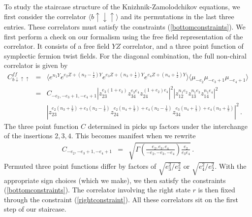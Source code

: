 \documentclass[12pt]{article}
\numberwithin{equation}{section}
\numberwithin{equation}{section}
\numberwithin{table}{section}\setlength{\multlinegap}{25pt}
\begin{document}
To study the staircase structure of the Knizhnik-Zamolodchikov equations, 
we first consider the correlator $\langle b \uparrow \downarrow \uparrow \rangle$
and its permutations in the last three entries. These correlators must satisfy the constraints
(\ref{bottomconstraints}). We first perform a check on our formalism using the free
field representation of the correlator. It consists of a free field $YZ$ correlator,
and a three point function of symplectic fermion twist fields. For the diagonal combination,
the full non-chiral correlator is given by
\begin{eqnarray}
C_{b  \downarrow \uparrow \uparrow}^{ff} &=& \langle e^{n_1 Y} e^{e_2 Z + (n_2-\frac{1}{2}) Y} e^{e_3 Z + (n_3+\frac{1}{2}) Y} e^{e_4 Z + (n_4+\frac{1}{2}) Y} \rangle
\langle \mu_{-e_2} \mu_{-e_3+1} \mu_{-e_4+1} \rangle
\nonumber \\
&=& C_{-e_2,-e_3+1,-e_4+1} |z_{23}^{e_3 (1+e_2)} z_{34}^{e_3 e_4} z_{24}^{(1+e_2) e_4}|^2 
|z_{12}^{n_1 e_2} z_{13}^{n_1 e_3} z_{14}^{n_1 e_4}|^2  \\
& &| z_{23}^{e_2 (n_3+\frac{1}{2})+e_3 (n_2-\frac{1}{2})} z_{24}^{e_2(n_4+\frac{1}{2})+e_4(n_2-\frac{1}{2})} z_{34}^{e_3 (n_4+\frac{1}{2})+e_4 (n_3+\frac{1}{2})}|^2 \, .
\nonumber
\end{eqnarray}
The three point function $C$ determined in \cite{Kausch:2000fu} picks up factors under the interchange of the insertions $2,3,4$.
This becomes manifest when we rewrite
\begin{eqnarray}
C_{-e_2,-e_3+1,-e_4+1} &=& \sqrt{ \Gamma( \frac{e_2,e_3,e_4}{-e_2,-e_3,-e_4}) \frac{e_2}{e_3 e_4} } \, .
\end{eqnarray}
Permuted three point functions differ by factors of $\sqrt{e_3^2/e_2^2}$ or $\sqrt{e_4^2/e_2^2}$.
With the appropriate sign choices (which we make), we then satisfy the constraints (\ref{bottomconstraints}).
The correlator involving the right state $r$ is then fixed through the constraint (\ref{rightconstraint}). All these correlators
sit on the first step of our staircase.
\end{document}

